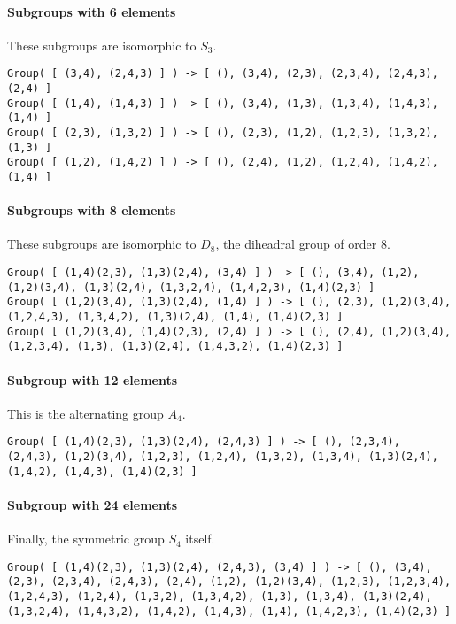 \paragraph{Subgroups with 6 elements}\label{subgroups-with-6-elements}

These subgroups are isomorphic to \(S_3\).

\begin{verbatim}
Group( [ (3,4), (2,4,3) ] ) -> [ (), (3,4), (2,3), (2,3,4), (2,4,3), (2,4) ]
Group( [ (1,4), (1,4,3) ] ) -> [ (), (3,4), (1,3), (1,3,4), (1,4,3), (1,4) ]
Group( [ (2,3), (1,3,2) ] ) -> [ (), (2,3), (1,2), (1,2,3), (1,3,2), (1,3) ]
Group( [ (1,2), (1,4,2) ] ) -> [ (), (2,4), (1,2), (1,2,4), (1,4,2), (1,4) ]
\end{verbatim}

\paragraph{Subgroups with 8 elements}\label{subgroups-with-8-elements}

These subgroups are isomorphic to \(D_8\), the diheadral group of order
8.

\begin{verbatim}
Group( [ (1,4)(2,3), (1,3)(2,4), (3,4) ] ) -> [ (), (3,4), (1,2), (1,2)(3,4), (1,3)(2,4), (1,3,2,4), (1,4,2,3), (1,4)(2,3) ]
Group( [ (1,2)(3,4), (1,3)(2,4), (1,4) ] ) -> [ (), (2,3), (1,2)(3,4), (1,2,4,3), (1,3,4,2), (1,3)(2,4), (1,4), (1,4)(2,3) ]
Group( [ (1,2)(3,4), (1,4)(2,3), (2,4) ] ) -> [ (), (2,4), (1,2)(3,4), (1,2,3,4), (1,3), (1,3)(2,4), (1,4,3,2), (1,4)(2,3) ]
\end{verbatim}

\paragraph{Subgroup with 12 elements}\label{subgroup-with-12-elements}

This is the alternating group \(A_4\).

\begin{verbatim}
Group( [ (1,4)(2,3), (1,3)(2,4), (2,4,3) ] ) -> [ (), (2,3,4), (2,4,3), (1,2)(3,4), (1,2,3), (1,2,4), (1,3,2), (1,3,4), (1,3)(2,4), (1,4,2), (1,4,3), (1,4)(2,3) ]
\end{verbatim}

\paragraph{Subgroup with 24 elements}\label{subgroup-with-24-elements}

Finally, the symmetric group \(S_4\) itself.

\begin{verbatim}
Group( [ (1,4)(2,3), (1,3)(2,4), (2,4,3), (3,4) ] ) -> [ (), (3,4), (2,3), (2,3,4), (2,4,3), (2,4), (1,2), (1,2)(3,4), (1,2,3), (1,2,3,4), (1,2,4,3), (1,2,4), (1,3,2), (1,3,4,2), (1,3), (1,3,4), (1,3)(2,4), (1,3,2,4), (1,4,3,2), (1,4,2), (1,4,3), (1,4), (1,4,2,3), (1,4)(2,3) ]
\end{verbatim}
